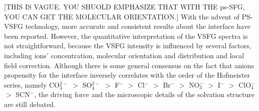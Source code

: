 [THIS IS VAGUE. YOU SHUOLD EMPHASIZE THAT WITH THE ps-SFG, YOU CAN GET THE MOLECULAR ORIENTATION.]
With the advent of PS-VSFG technology, more accurate and consistent results about the interface have been reported\cite{TianCS2009,Shen2013}. However, the quantitative interpretation of the VSFG spectra is not straightforward, because the VSFG intensity is influenced by several factors, including ions' concentration, 
molecular orientation and distribution and local field correction\cite{Morita2008}.
Although there is some general consensus on the fact that anions propensity for the interface inversely correlates with
the order of the Hofmeister series, namely 
CO$_3^{2-}$ $>$  SO$_4^{2-}$ $>$ F$^-$ $>$ Cl$^-$ $>$ Br$^-$ $>$ NO$_3^-$ $>$ I$^-$ $>$ ClO$_4^-$ $>$ SCN$^-$\cite{PJ06,ZYJ10,DT08,Parsons2011,HuaWei2013}, the driving force and the microscopic details of the solvation structure are still debated. 

